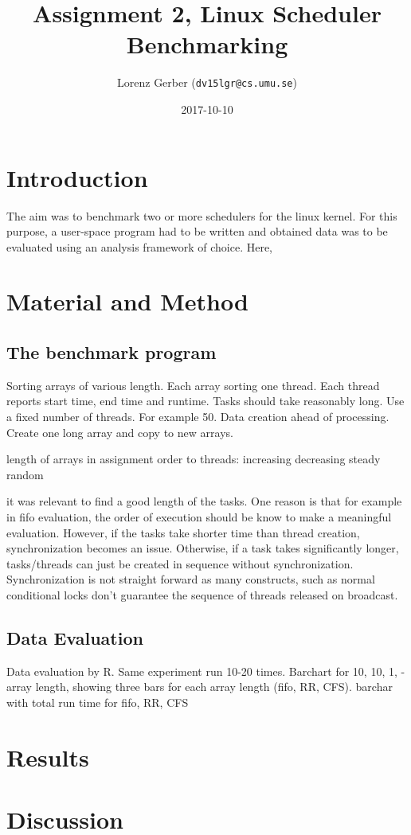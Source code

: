 \documentclass[a4paper,11pt,twoside]{article}
\title{Assignment 2, Linux Scheduler Benchmarking}
\author{Lorenz Gerber ({\tt{dv15lgr@cs.umu.se}})}
\date{2017-10-10}
\begin{document}
\lstset{language=C}
\maketitle
\thispagestyle{empty}
\newpage
\tableofcontents
\thispagestyle{empty}
\newpage

\clearpage
{}

\section{Introduction}
The aim was to benchmark two or more schedulers for the linux kernel.
For this purpose, a user-space program had to be written and obtained
data was to be evaluated using an analysis framework of choice.
Here,

\section{Material and Method}
\subsection{The benchmark program}
Sorting arrays of various length. Each array sorting one thread. Each thread
reports start time, end time and runtime. Tasks should take reasonably long.
Use a fixed number of threads. For example 50. Data creation ahead of
processing. Create one long array and copy to new arrays.

length of arrays in assignment order to threads:
increasing
decreasing
steady
random

it was relevant to find a good length of the tasks. One reason is that
for example in fifo evaluation, the order of execution should be know
to make a meaningful evaluation. However, if the tasks take shorter time
than thread creation, synchronization becomes an issue. Otherwise, if a
task takes significantly longer, tasks/threads can just be created in
sequence without synchronization. Synchronization is not straight forward
as many constructs, such as normal conditional locks don't guarantee the
sequence of threads released on broadcast.


\subsection{Data Evaluation}
Data evaluation by R. Same experiment run 10-20 times.
Barchart for 10, 10, 1, - array length, showing three bars for each array length (fifo, RR, CFS).
barchar with total run time for fifo, RR, CFS



\section{Results}


\section{Discussion}


%
\end{document}
